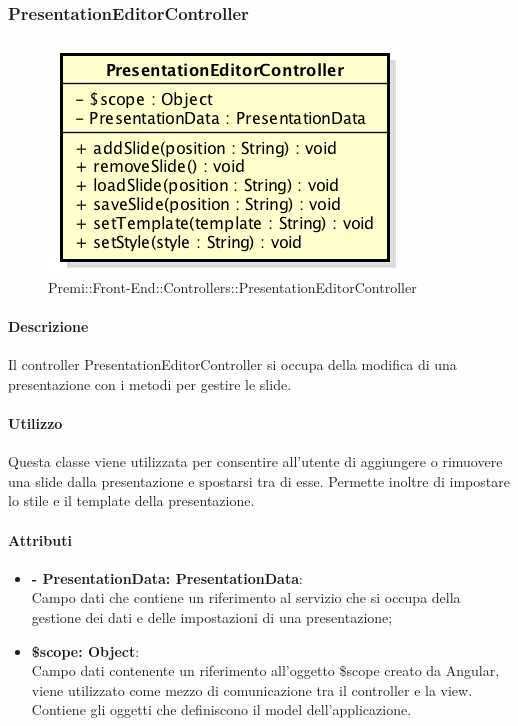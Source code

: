 	
\subsubsection{PresentationEditorController}
\begin{figure}[h]
	\centering
	\includegraphics[width=0.5\linewidth]{img/premi_front_end_controllers_presentationeditorcontroller}
	\caption[Premi::Front-End::Controllers::PresentationEditorController]{Premi::Front-End::Controllers::PresentationEditorController}
\end{figure}

	\paragraph{Descrizione}
	Il controller PresentationEditorController si occupa della modifica di una presentazione con i metodi per gestire le slide.
	
	\paragraph{Utilizzo}
	Questa classe viene utilizzata per consentire all'utente di aggiungere o rimuovere una slide dalla presentazione e spostarsi tra di esse. Permette inoltre di impostare lo stile e il template della presentazione.
	
	\paragraph{Attributi}
	\begin{itemize}
		\item \textbf{- PresentationData: PresentationData}:\\
				Campo dati che contiene un riferimento al servizio che si occupa della gestione dei dati e delle impostazioni di una presentazione;
		\item \textbf{\$scope: Object}:\\
				Campo dati contenente un riferimento all'oggetto \$scope creato da Angular, viene utilizzato come mezzo di comunicazione tra il controller e la view. Contiene gli oggetti che definiscono il model dell'applicazione.
	\end{itemize}
	
